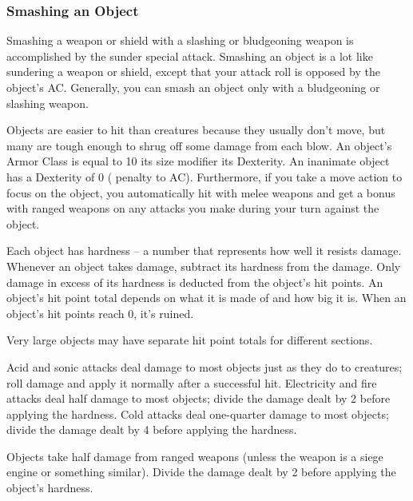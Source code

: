 \subsubsection{Smashing an Object}
Smashing a weapon or shield with a slashing or bludgeoning weapon is accomplished by the sunder special attack. Smashing an object is a lot like sundering a weapon or shield, except that your attack roll is opposed by the object's AC. Generally, you can smash an object only with a bludgeoning or slashing weapon.

 Objects are easier to hit than creatures because they usually don't move, but many are tough enough to shrug off some damage from each blow. An object's Armor Class is equal to 10 \add its size modifier \add its Dexterity. An inanimate object has a Dexterity of 0 ( penalty to AC). Furthermore, if you take a move action to focus on the object, you automatically hit with melee weapons and get a  bonus with ranged weapons on any attacks you make during your turn against the object.

 Each object has hardness -- a number that represents how well it resists damage. Whenever an object takes damage, subtract its hardness from the damage. Only damage in excess of its hardness is deducted from the object's hit points.
 An object's hit point total depends on what it is made of and how big it is. When an object's hit points reach 0, it's ruined.

Very large objects may have separate hit point totals for different sections.

 Acid and sonic attacks deal damage to most objects just as they do to creatures; roll damage and apply it normally after a successful hit. Electricity and fire attacks deal half damage to most objects; divide the damage dealt by 2 before applying the hardness. Cold attacks deal one-quarter damage to most objects; divide the damage dealt by 4 before applying the hardness.

 Objects take half damage from ranged weapons (unless the weapon is a siege engine or something similar). Divide the damage dealt by 2 before applying the object's hardness.

